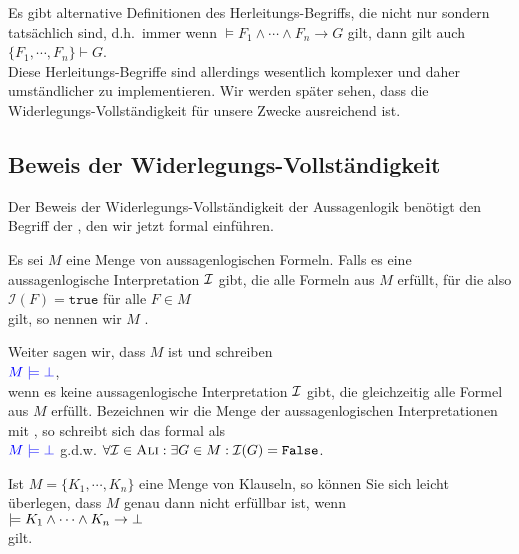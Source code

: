 \remark
Es gibt alternative Definitionen des Herleitungs-Begriffs, die nicht nur  sondern
tatsächlich  sind, d.h.~immer wenn $\models F_1 \wedge \cdots \wedge F_n \rightarrow G$ gilt, dann gilt auch
\\[0.2cm]
\hspace*{1.3cm}
$\{ F_1, \cdots, F_n \} \vdash G$.
\\[0.2cm]  
Diese Herleitungs-Begriffe sind allerdings wesentlich komplexer und daher umständlicher zu implementieren.  Wir
werden später sehen, dass die Widerlegungs-Vollständigkeit für unsere Zwecke ausreichend ist.
\eox

\subsection{Beweis der Widerlegungs-Vollständigkeit}
Der Beweis der Widerlegungs-Vollständigkeit der Aussagenlogik benötigt den  Begriff der
, den wir jetzt formal einführen. 

\begin{Definition}[Erfüllbarkeit]
  Es sei $M$ eine Menge von aussagenlogischen Formeln.
  Falls es eine aussagen\-logische Interpretation $\mathcal{I}$ gibt, die alle Formeln aus $M$ erfüllt, für die also
  \\[0.2cm]
  \hspace*{1.3cm}
  $\mathcal{I}(F) = \mathtt{true}$ \quad für alle $F \in M$
  \\[0.2cm]
  gilt, so nennen wir $M$ . 

  Weiter sagen wir, dass $M$  ist und schreiben 
  \\[0.2cm]
  \hspace*{1.3cm}
  ${\color{blue}M \models \bot}$,
  \\[0.2cm]
  wenn es keine aussagenlogische Interpretation $\mathcal{I}$ gibt, die gleichzeitig alle Formel aus $M$ erfüllt.
  Bezeichnen wir die Menge der aussagenlogischen Interpretationen mit
  \textsc{}, so schreibt sich das formal als
  \\[0.2cm]
  \hspace*{1.3cm}
  ${\color{blue}M \models \bot}$ \quad g.d.w. \quad 
  $\forall \mathcal{I} \in \textsc{Ali}: \exists G \in M: \mathcal{I}(G) = \texttt{False}$.   
  \eox
\end{Definition}

\remark 
Ist $M = \{ K_1, \cdots, K_n \}$ eine Menge von Klauseln, so können Sie sich leicht überlegen, dass
$M$ genau dann nicht erfüllbar ist, wenn
\\[0.2cm]
\hspace*{1.3cm}
$\models K_1 \wedge \cdots \wedge K_n \rightarrow \bot$
\\[0.2cm]
gilt. \eox

